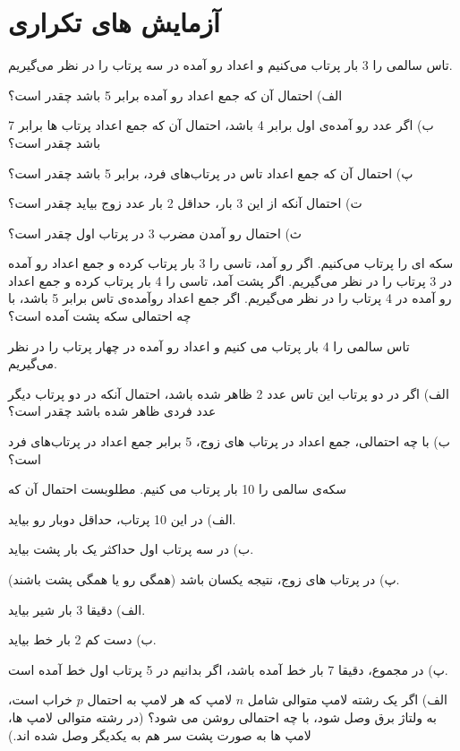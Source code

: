 \chapter{آزمایش های تکراری}

\Q
تاس سالمی را 3 بار پرتاب می‌کنیم و اعداد رو آمده در سه پرتاب را در نظر می‌گیریم.

الف) احتمال آن که جمع اعداد رو آمده برابر 5 باشد چقدر است؟

ب) اگر عدد رو آمده‌ی اول برابر 4 باشد، احتمال آن که جمع اعداد پرتاب ها برابر 7 باشد چقدر است؟

پ) احتمال آن که جمع اعداد تاس در پرتاب‌های فرد، برابر 5 باشد چقدر است؟

ت) احتمال آنکه از این 3 بار، حداقل 2 بار عدد زوج بیاید چقدر است؟

ث) احتمال رو آمدن مضرب 3 در پرتاب اول چقدر است؟


\Q
سکه ای را پرتاب می‌کنیم. اگر رو آمد، تاسی را 3 بار پرتاب کرده و جمع اعداد رو آمده در 3 پرتاب را در نظر می‌گیریم. اگر پشت آمد، تاسی را 4 بار پرتاب کرده و جمع اعداد رو آمده در 4 پرتاب را در نظر می‌گیریم. اگر جمع اعداد روآمده‌ی تاس برابر 5 باشد، با چه احتمالی سکه پشت آمده است؟


\Q
تاس سالمی را 4 بار پرتاب می کنیم و اعداد رو آمده در چهار پرتاب را در نظر می‌گیریم.

الف) اگر در دو پرتاب این تاس عدد 2 ظاهر شده باشد، احتمال آنکه در دو پرتاب دیگر عدد فردی ظاهر شده باشد چقدر است؟

ب) با چه احتمالی، جمع اعداد در پرتاب های زوج، 5 برابر جمع اعداد در پرتاب‌های فرد است؟

 
\Q
سکه‌ی سالمی را 10 بار پرتاب می کنیم. مطلوبست احتمال آن که

الف) در این 10 پرتاب، حداقل دوبار رو بیاید.

ب) در سه پرتاب اول حداکثر یک بار پشت بیاید.

پ) در پرتاب های زوج، نتیجه یکسان باشد (همگی رو یا همگی پشت باشند).

الف) دقیقا 3 بار شیر بیاید.

ب) دست کم 2 بار خط بیاید.

پ) در مجموع، دقیقا 7 بار خط آمده باشد، اگر بدانیم در 5 پرتاب اول خط آمده است.

 
\Q
الف) اگر یک رشته لامپ متوالی شامل $n$ لامپ که هر لامپ به احتمال $p$ خراب است، به ولتاژ برق وصل شود، با چه احتمالی روشن می شود؟ (در رشته متوالی لامپ ها، لامپ ها به صورت پشت سر هم به یکدیگر وصل شده اند.)

